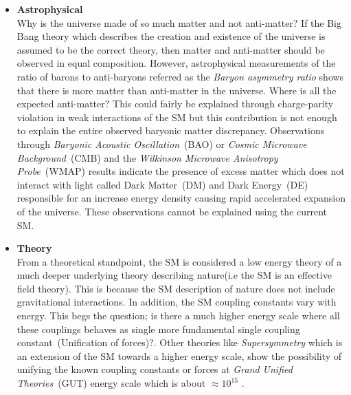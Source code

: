 \begin{itemize}
\item \textbf{Astrophysical} \mbox{}\\
Why is the universe made of so much matter and not anti-matter? If the Big Bang theory which describes the creation and existence of the universe is assumed to be the correct theory, then matter and anti-matter should be observed in equal composition. However, astrophysical measurements of the ratio of barons to anti-baryons referred as the \textit{Baryon asymmetry ratio} shows that there is more matter than anti-matter in the universe. Where is all the expected anti-matter? This could fairly be explained through charge-parity violation in weak interactions of the SM but this contribution is not enough to explain the entire observed baryonic matter discrepancy. Observations through \textit{Baryonic Acoustic Oscillation}~(BAO) or \textit{Cosmic Microwave Background}~(CMB) and the \textit{Wilkinson Microwave Anisotropy Probe}~(WMAP) results indicate the presence of excess matter which does not interact with light called Dark Matter~(DM) and Dark Energy~(DE) responsible for an increase energy density causing rapid accelerated expansion of the universe. These observations cannot be explained using the current SM.
\item \textbf{Theory} \mbox{}\\
From a theoretical standpoint, the SM is considered a low energy theory of a much deeper underlying theory describing nature(i.e the SM is an effective field theory). This is because the SM description of nature does not include gravitational interactions. In addition, the SM coupling constants vary with energy. This begs the question; is there  a much higher energy scale where all these couplings behaves as single more fundamental single coupling constant~(Unification of forces)?. Other theories like \textit{Supersymmetry} which is an extension of the SM towards a higher energy scale, show the possibility of unifying the known coupling constants or forces at \textit{Grand Unified Theories}~(GUT) energy scale which is about $\approx 10^{15}$ \GeV.


\end{itemize}
